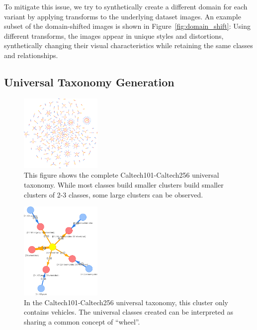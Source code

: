 To mitigate this issue, we try to synthetically create a different domain for each variant by applying transforms to the
underlying dataset images.
An example subset of the domain-shifted images is shown in Figure~\ref{fig:domain_shift}:
Using different transforms, the images appear in unique styles and distortions,
synthetically changing their visual characteristics
while retaining the same classes and relationships.





\subsection{Universal Taxonomy Generation}

\begin{figure}[ht]
      \centering
      \includegraphics[width=0.35\textwidth]{figures/taxonomy.png}

      \caption{This figure shows the complete Caltech101-Caltech256 universal taxonomy.
            While most classes build smaller clusters build smaller clusters of 2-3 classes,
            some large clusters can be observed.}
      \label{fig:taxonomy}
\end{figure}

\begin{figure}[ht]
      \centering
      \includegraphics[width=0.35\textwidth]{figures/wheel_concept.png}

      \caption{In the Caltech101-Caltech256 universal taxonomy,
            this cluster only contains vehicles. The universal classes created can be interpreted as
            sharing a common concept of \enquote{wheel}.}
      \label{fig:wheel_concept}
\end{figure}


